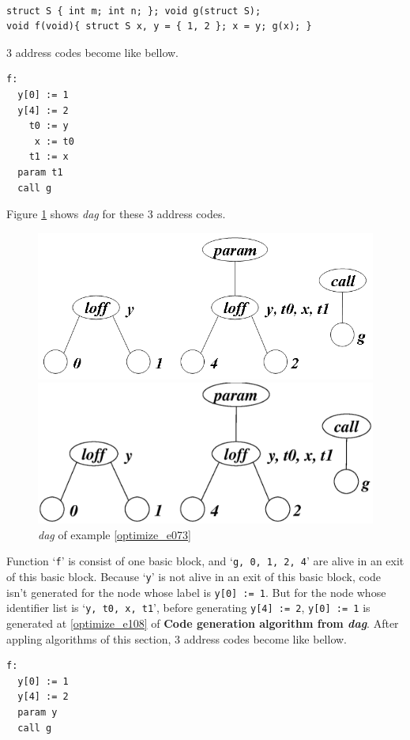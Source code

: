 \begin{Example}
\label{optimize_e073}
\begin{verbatim}

struct S { int m; int n; }; void g(struct S);
void f(void){ struct S x, y = { 1, 2 }; x = y; g(x); }
\end{verbatim}
3 address codes become like bellow.
\begin{verbatim}
f:
  y[0] := 1
  y[4] := 2
    t0 := y
     x := t0
    t1 := x
  param t1
  call g
\end{verbatim}
Figure \ref{optimize_e074} shows {\em dag} for these 3 address codes.
\begin{figure}[htbp]
\begin{center}
\begin{htmlonly}
\includegraphics[width=1.0\linewidth,height=0.439\linewidth]{opt030.png}
\end{htmlonly}
\begin{latexonly}
\includegraphics[width=1.0\linewidth,height=0.439\linewidth]{opt030.eps}
\end{latexonly}
\caption{{\em dag} of example \ref{optimize_e073}}
\label{optimize_e074}
\end{center}
\end{figure}
Function `{\tt{f}}' is consist of one basic block, and 
`{\tt{g, 0, 1, 2, 4}}' are alive in an exit of this basic block.
Because `{\tt{y}}' is not alive in an exit of this basic block,
code isn't generated for the node whose label is {\tt{y[0] := 1}}. 
But for the node whose identifier list is `{\tt{y, t0, x, t1}}',
before generating {\tt{y[4] := 2}},
{\tt{y[0] := 1}} is generated at \ref{optimize_e108} of
{\bf Code generation algorithm from {\em dag}}.
After appling algorithms of this section,
3 address codes become like bellow.
\begin{verbatim}
f:
  y[0] := 1
  y[4] := 2
  param y
  call g
\end{verbatim}
\end{Example}

